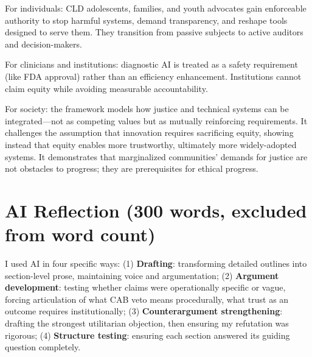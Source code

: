 \documentclass[12pt,a4paper]{article}
\begin{document}
For individuals: CLD adolescents, families, and youth advocates gain enforceable authority to stop harmful systems, demand transparency, and reshape tools designed to serve them. They transition from passive subjects to active auditors and decision-makers.

For clinicians and institutions: diagnostic AI is treated as a safety requirement (like FDA approval) rather than an efficiency enhancement. Institutions cannot claim equity while avoiding measurable accountability.

For society: the framework models how justice and technical systems can be integrated—not as competing values but as mutually reinforcing requirements. It challenges the assumption that innovation requires sacrificing equity, showing instead that equity enables more trustworthy, ultimately more widely-adopted systems. It demonstrates that marginalized communities' demands for justice are not obstacles to progress; they are prerequisites for ethical progress.

\section*{AI Reflection (300 words, excluded from word count)}

\begin{tcolorbox}[colback=questionbg,colframe=questionborder,title=\textbf{REFLECTION QUESTION:} How specifically did you use AI?]
\end{tcolorbox}

I used AI in four specific ways: (1) \textbf{Drafting}: transforming detailed outlines into section-level prose, maintaining voice and argumentation; (2) \textbf{Argument development}: testing whether claims were operationally specific or vague, forcing articulation of what CAB veto means procedurally, what trust as an outcome requires institutionally; (3) \textbf{Counterargument strengthening}: drafting the strongest utilitarian objection, then ensuring my refutation was rigorous; (4) \textbf{Structure testing}: ensuring each section answered its guiding question completely.

\begin{tcolorbox}[colback=questionbg,colframe=questionborder,title=\textbf{REFLECTION QUESTION:} What did you learn about AI's abilities and limitations?]
\end{tcolorbox}
\end{document}
